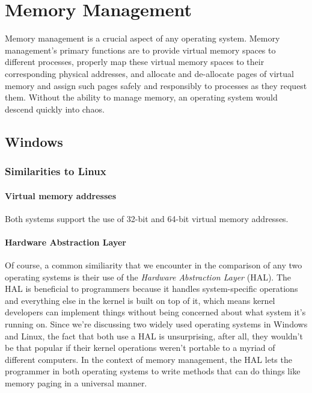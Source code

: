 \documentclass[letterpaper,10pt,titlepage]{article}
\begin{document}
\section{Memory Management}
Memory management is a crucial aspect of any operating system. Memory management's primary functions are to provide virtual memory spaces to different processes, properly map these virtual memory spaces to their corresponding physical addresses, and allocate and de-allocate pages of virtual memory and assign such pages safely and responsibly to processes as they request them. Without the ability to manage memory, an operating system would descend quickly into chaos.

\subsection{Windows}
% 
%
%
\subsubsection{Similarities to Linux}
\paragraph{Virtual memory addresses}
Both systems support the use of 32-bit and 64-bit virtual memory addresses. \cite{windows1} \cite{linux1}
\paragraph{Hardware Abstraction Layer}
Of course, a common similiarity that we encounter in the comparison of any two operating systems is their use of the \emph{Hardware Abstraction Layer} (HAL). The HAL is beneficial to programmers because it handles system-specific operations and everything else in the kernel is built on top of it, which means kernel developers can implement things without being concerned about what system it's running on. Since we're discussing two widely used operating systems in Windows and Linux, the fact that both use a HAL is unsurprising, after all, they wouldn't be that popular if their kernel operations weren't portable to a myriad of different computers. In the context of memory management, the HAL lets the programmer in both operating systems to write methods that can do things like memory paging in a universal manner. 
\end{document}
